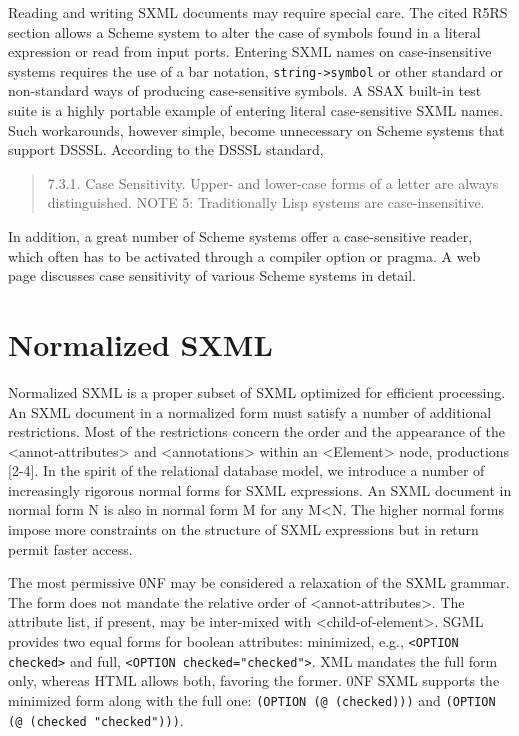 \documentclass[10pt]{article}
\begin{document}
Reading and writing SXML documents may require special care. The cited R5RS section allows a Scheme system to alter the case of symbols found in a literal expression or read from input ports. Entering SXML names on case-insensitive systems requires the use of a bar notation, \texttt{string->symbol} or
other standard or non-standard ways of producing case-sensitive
symbols. A SSAX built-in test suite is a highly portable example of entering literal case-sensitive SXML names. Such workarounds, however simple, become unnecessary on Scheme systems that support DSSSL. According to the DSSSL standard,\begin{quote}
7.3.1. Case Sensitivity. Upper- and lower-case forms of a
letter are always distinguished. NOTE 5: Traditionally Lisp systems
are case-insensitive.\end{quote}
In addition, a great number of Scheme systems offer a
case-sensitive reader, which often has to be activated through a
compiler option or pragma. A web page \cite{Scheme-case-sensitivity} discusses case sensitivity of various Scheme systems in detail.

\section{Normalized SXML}
Normalized SXML is a proper subset of SXML optimized for
efficient processing. An SXML document in a normalized form must
satisfy a number of additional restrictions. Most of the restrictions
concern the order and the appearance of the <annot-attributes> and <annotations> within an
<Element> node, productions [2-4]. In the spirit of the
relational database model, we introduce a number of increasingly
rigorous normal forms for SXML expressions. An SXML document in normal
form N is also in normal form M for any M<N. The higher normal forms
impose more constraints on the structure of SXML expressions but in
return permit faster access.

The most permissive 0NF may be considered a relaxation of the
SXML grammar. The form does not mandate the relative order of <annot-attributes>. The attribute list, if present, may be
inter-mixed with <child-of-element>. SGML provides two
equal forms for boolean attributes: minimized, e.g., \texttt{<OPTION
checked>} and full, \texttt{<OPTION checked="checked">}. XML
mandates the full form only, whereas HTML allows both, favoring the
former. 0NF SXML supports the minimized form along with the full one:
\texttt{(OPTION (@ (checked)))} and \texttt{(OPTION (@ (checked
"checked")))}.
\end{document}
